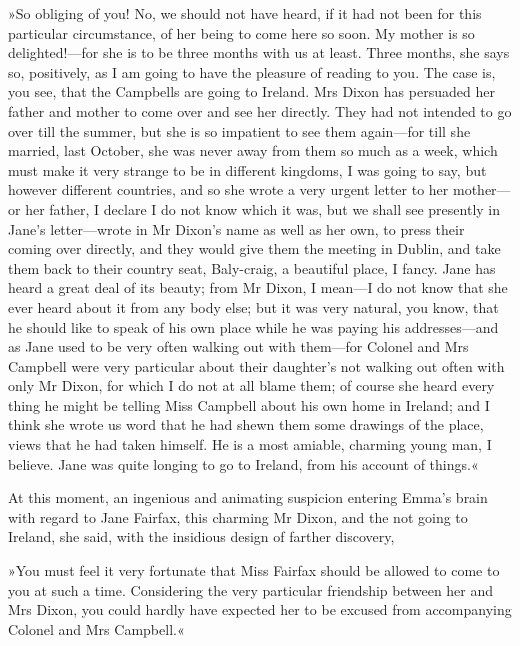 »So obliging of you! No, we should not have heard, if it had not been for this particular circumstance, of her being to come here so soon. My mother is so delighted!—for she is to be three months with us at least. Three months, she says so, positively, as I am going to have the pleasure of reading to you. The case is, you see, that the Campbells are going to Ireland. Mrs Dixon has persuaded her father and mother to come over and see her directly. They had not intended to go over till the summer, but she is so impatient to see them again—for till she married, last October, she was never away from them so much as a week, which must make it very strange to be in different kingdoms, I was going to say, but however different countries, and so she wrote a very urgent letter to her mother—or her father, I declare I do not know which it was, but we shall see presently in Jane's letter—wrote in Mr Dixon's name as well as her own, to press their coming over directly, and they would give them the meeting in Dublin, and take them back to their country seat, Baly-craig, a beautiful place, I fancy. Jane has heard a great deal of its beauty; from Mr Dixon, I mean—I do not know that she ever heard about it from any body else; but it was very natural, you know, that he should like to speak of his own place while he was paying his addresses—and as Jane used to be very often walking out with them—for Colonel and Mrs Campbell were very particular about their daughter's not walking out often with only Mr Dixon, for which I do not at all blame them; of course she heard every thing he might be telling Miss Campbell about his own home in Ireland; and I think she wrote us word that he had shewn them some drawings of the place, views that he had taken himself. He is a most amiable, charming young man, I believe. Jane was quite longing to go to Ireland, from his account of things.«

At this moment, an ingenious and animating suspicion entering Emma's brain with regard to Jane Fairfax, this charming Mr Dixon, and the not going to Ireland, she said, with the insidious design of farther discovery,

»You must feel it very fortunate that Miss Fairfax should be allowed to come to you at such a time. Considering the very particular friendship between her and Mrs Dixon, you could hardly have expected her to be excused from accompanying Colonel and Mrs Campbell.«

